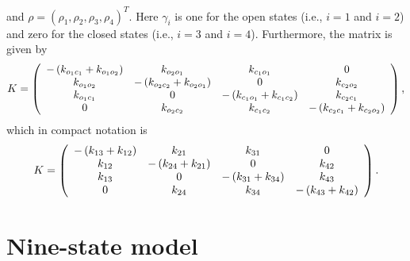 and $\rho=(\rho_1,\rho_2,\rho_3,\rho_4)^T.$ 
Here $\gamma_{i}$ is one for the open states (i.e., $i=1$ and $i=2$) and zero for
the closed states (i.e., $i=3$ and $i=4$). Furthermore, the matrix is given by%
\[
K=\left(
\begin{array}
[c]{cccc}%
-\left(  k_{o_{1}c_{1}}+k_{o_{1}o_{2}}\right)   & k_{o_{2}o_{1}} &
k_{c_{1}o_{1}} & 0\\
k_{o_{1}o_{2}} & -\left(  k_{o_{2}c_{2}}+k_{o_{2}o_{1}}\right)   & 0 &
k_{c_{2}o_{2}}\\
k_{o_{1}c_{1}} & 0 & -\left(  k_{c_{1}o_{1}}+k_{c_{1}c_{2}}\right)   &
k_{c_{2}c_{1}}\\
0 & k_{o_{2}c_{2}} & k_{c_{1}c_{2}} & -\left(  k_{c_{2}c_{1}}+k_{c_{2}o_{2}%
}\right)
\end{array}
\right),
\]
which in compact notation is%
\[
K=\left(
\begin{array}
[c]{cccc}%
-\left(  k_{13}+k_{12}\right)   & k_{21} & k_{31} & 0\\
k_{12} & -\left(  k_{24}+k_{21}\right)   & 0 & k_{42}\\
k_{13} & 0 & -\left(  k_{31}+k_{34}\right)   & k_{43}\\
0 & k_{24} & k_{34} & -\left(  k_{43}+k_{42}\right)
\end{array}
\right)  .
\]

\bigskip
\section{Nine-state model}

